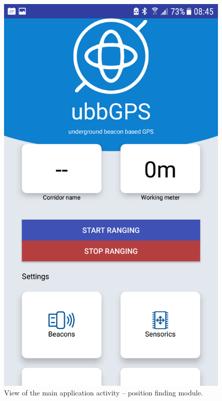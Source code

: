 \documentclass[../main.tex]{subfiles}
\begin{document}
\begin{figure}[!htbp]
\begin{minipage}{0.33\linewidth}
\includegraphics[width=\textwidth, clip]{pictures/app_main_screen.png}
\caption{View of the main application activity -- position finding module.}
\label{fig:app_main_screen}
\end{minipage}\hfill%
\begin{minipage}{0.33\linewidth}

\end{minipage}
\end{figure}
\end{document}
